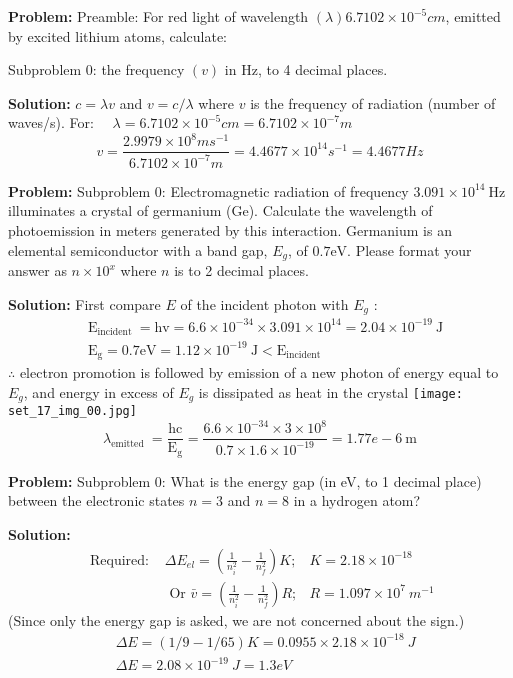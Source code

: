 \documentclass[10pt]{article}
\begin{document}
\textbf{Problem:}
Preamble: For red light of wavelength $(\lambda) 6.7102 \times 10^{-5} cm$, emitted by excited lithium atoms, calculate:

Subproblem 0: the frequency $(v)$ in Hz, to 4 decimal places. 


\textbf{Solution:}
$c=\lambda v$ and $v=c / \lambda$ where $v$ is the frequency of radiation (number of waves/s).
For: $\quad \lambda=6.7102 \times 10^{-5} cm=6.7102 \times 10^{-7} m$
\[
v=\frac{2.9979 \times 10^{8} {ms}^{-1}}{6.7102 \times 10^{-7} m}=4.4677 \times 10^{14} {s}^{-1}= \boxed{4.4677} Hz
\]


\textbf{Problem:}
Subproblem 0: Electromagnetic radiation of frequency $3.091 \times 10^{14} \mathrm{~Hz}$ illuminates a crystal of germanium (Ge). Calculate the wavelength of photoemission in meters generated by this interaction. Germanium is an elemental semiconductor with a band gap, $E_{g}$, of $0.7 \mathrm{eV}$. Please format your answer as $n \times 10^x$ where $n$ is to 2 decimal places.


\textbf{Solution:}
First compare $E$ of the incident photon with $E_{g}$ :
\[
\begin{aligned}
&\mathrm{E}_{\text {incident }}=\mathrm{hv}=6.6 \times 10^{-34} \times 3.091 \times 10^{14}=2.04 \times 10^{-19} \mathrm{~J} \\
&\mathrm{E}_{\mathrm{g}}=0.7 \mathrm{eV}=1.12 \times 10^{-19} \mathrm{~J}<\mathrm{E}_{\text {incident }}
\end{aligned}
\]
$\therefore$ electron promotion is followed by emission of a new photon of energy equal to $E_{g}$, and energy in excess of $E_{g}$ is dissipated as heat in the crystal
\texttt{[image: set\_17\_img\_00.jpg]}
\nonessentialimage
$$
\lambda_{\text {emitted }}=\frac{\mathrm{hc}}{\mathrm{E}_{\mathrm{g}}}=\frac{6.6 \times 10^{-34} \times 3 \times 10^{8}}{0.7 \times 1.6 \times 10^{-19}}= \boxed{1.77e-6} \mathrm{~m}
$$


\textbf{Problem:}
Subproblem 0: What is the energy gap (in eV, to 1 decimal place) between the electronic states $n=3$ and $n=8$ in a hydrogen atom?


\textbf{Solution:}
\[
\begin{array}{rlr}
\text { Required: } & \Delta {E}_{{el}}=\left(\frac{1}{{n}_{{i}}^{2}}-\frac{1}{{n}_{{f}}^{2}}\right) {K} ; & {K}=2.18 \times 10^{-18} \\
& \text { Or } \bar{v}=\left(\frac{1}{{n}_{{i}}^{2}}-\frac{1}{{n}_{{f}}^{2}}\right) {R} ; & {R}=1.097 \times 10^{7} {~m}^{-1}
\end{array}
\]
(Since only the energy gap is asked, we are not concerned about the sign.)
\[
\begin{aligned}
&\Delta {E}=(1 / 9-1 / 65) {K}=0.0955 \times 2.18 \times 10^{-18} {~J} \\
&\Delta {E}=2.08 \times 10^{-19} {~J}=\boxed{1.3} {eV}
\end{aligned}
\]
\end{document}

